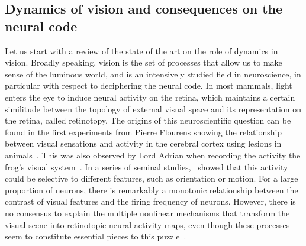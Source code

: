 \documentclass[brainsci, %
               review,submit,pdftex,moreauthors
               ]{Definitions/mdpi}
\begin{document}
\subsection{Dynamics of vision and consequences on the neural code}%
%
Let us start with a review of the state of the art on the role of dynamics in vision. Broadly speaking, vision is the set of processes that allow us to make sense of the luminous world, and is an intensively studied field in neuroscience, in particular with respect to deciphering the neural code. In most mammals, light enters the eye to induce neural activity on the retina, which maintains a certain similitude between the topology of external visual space and its representation on the retina, called retinotopy. The origins of this neuroscientific question can be found in the first experiments from Pierre Flourens showing the relationship between visual sensations and activity in the cerebral cortex using lesions in animals~\citep{flourens_recherches_1842,pearce_marie-jean-pierre_2009}. This was also observed by Lord Adrian when recording the activity the frog's visual system~\citep{adrian_impulses_1926}. In a series of seminal studies,~\citet{hubel_receptive_1968} showed that this activity could be selective to different features, such as orientation or motion. For a large proportion of neurons, there is remarkably a monotonic relationship between the contrast of visual features and the firing frequency of neurons. However, there is no consensus to explain the multiple nonlinear mechanisms that transform the visual scene into retinotopic neural activity maps, even though these processes seem to constitute essential pieces to this puzzle~\citep{carandini_normalization_2012}. 
\end{document}
